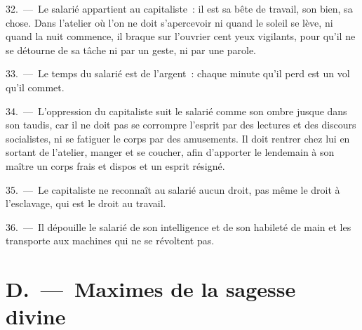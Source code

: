 \documentclass[french,twoside]{book} %
\begin{document}
32. — Le salarié appartient au capitaliste : il est sa bête de travail, son bien, sa chose. Dans l’atelier où l’on ne doit s’apercevoir ni quand le soleil se lève, ni quand la nuit commence, il braque sur l’ouvrier cent yeux vigilants, pour qu’il ne se détourne de sa tâche ni par un geste, ni par une parole.\par
33. — Le temps du salarié est de l’argent : chaque minute qu’il perd est un vol qu’il commet.\par
34. — L'oppression du capitaliste suit le salarié comme son ombre jusque dans son taudis, car il ne doit pas se corrompre l’esprit par des lectures et des discours socialistes, ni se fatiguer le corps par des amusements. Il doit rentrer chez lui en sortant de l’atelier, manger et se coucher, afin d’apporter le lendemain à son maître un corps frais et dispos et un esprit résigné.\par
35. — Le capitaliste ne reconnaît au salarié aucun droit, pas même le droit à l’esclavage, qui est le droit au travail.\par
36. — Il dépouille le salarié de son intelligence et de son habileté de main et les transporte aux machines qui ne se révoltent pas.

\section[{D. — Maximes de la sagesse divine}]{D. — Maximes de la sagesse divine}
\end{document}
